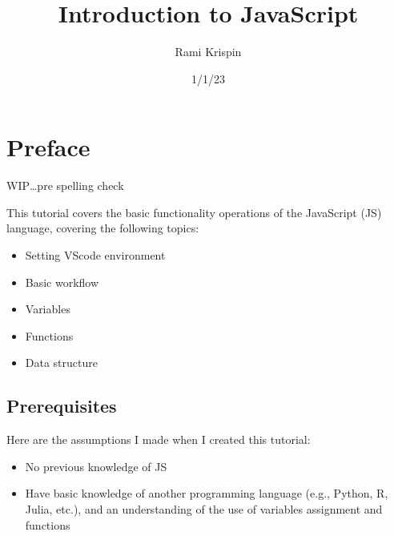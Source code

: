 \documentclass[
  letterpaper,
  DIV=11,
  numbers=noendperiod]{scrreprt}
\title{Introduction to JavaScript}
\author{Rami Krispin}
\date{1/1/23}
\providecommand{\tightlist}{%
  \setlength{\itemsep}{0pt}\setlength{\parskip}{0pt}}\usepackage{longtable,booktabs,array}
\renewcommand*\contentsname{Table of contents}
\newcommand\contentsname{Table of contents}
\begin{document}
\maketitle
\ifdefined\Shaded\renewenvironment{Shaded}{\begin{tcolorbox}[breakable, borderline west={3pt}{0pt}{shadecolor}, frame hidden, sharp corners, enhanced, boxrule=0pt, interior hidden]}{\end{tcolorbox}}\fi

\renewcommand*\contentsname{Table of contents}
{
\hypersetup{linkcolor=}
\setcounter{tocdepth}{2}
\tableofcontents
}

\hypertarget{preface}{%
\chapter*{Preface}\label{preface}}


WIP\ldots pre spelling check

This tutorial covers the basic functionality operations of the
JavaScript (JS) language, covering the following topics:

\begin{itemize}
\tightlist
\item
  Setting VScode environment
\item
  Basic workflow
\item
  Variables
\item
  Functions
\item
  Data structure
\end{itemize}

\hypertarget{prerequisites}{%
\section*{Prerequisites}\label{prerequisites}}


Here are the assumptions I made when I created this tutorial:

\begin{itemize}
\tightlist
\item
  No previous knowledge of JS
\item
  Have basic knowledge of another programming language (e.g., Python, R,
  Julia, etc.), and an understanding of the use of variables assignment
  and functions
\end{itemize}
\end{document}
